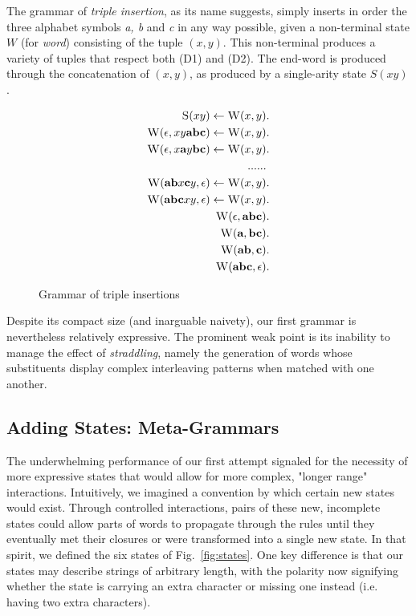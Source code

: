 \documentclass[nonatbib,numbers,10pt]{llncs}
\newcommand\s{\textsc}
\begin{document}
The grammar of \textit{triple insertion}, as its name suggests, simply inserts in order the three alphabet symbols \textit{a, b} and \textit{c} in any way possible, given a non-terminal state $W$ (for \textit{word}) consisting of the tuple $(x,y)$. This non-terminal produces a variety of tuples that respect both (D1) and (D2). The end-word is produced through the concatenation of $(x,y)$, as produced by a single-arity state $S(xy)$.
\begin{figure}[h!]
\begin{align}
\setcounter{equation}{0}
\s{S}(xy) \leftarrow \s{W}(x,y)&. \\
\s{W}(\epsilon, xy\textbf{abc}) \leftarrow \s{W}(x,y)&. \\
\s{W}(\epsilon, x\textbf{a}y\textbf{bc}) \leftarrow \s{W}(x,y)&. \\
...... \nonumber \\
\setcounter{equation}{59}
\s{W}(\textbf{ab}x\textbf{c}y, \epsilon) \leftarrow \s{W}(x,y)&. \\
\s{W}(\textbf{abc}xy, \epsilon) \leftarrow \s{W}(x,y)&. \\
\s{W}(\epsilon, \textbf{abc})&. \\
\s{W}(\textbf{a}, \textbf{bc})&. \\
\s{W}(\textbf{ab}, \textbf{c})&. \\
\s{W}(\textbf{abc}, \epsilon)&.
\end{align}
\caption{Grammar of triple insertions}
\end{figure}

Despite its compact size (and inarguable naivety), our first grammar is nevertheless relatively expressive. The prominent weak point is its inability to manage the effect of \textit{straddling}, namely the generation of words whose substituents display complex interleaving patterns when matched with one another.
\subsection{Adding States: Meta-Grammars}
The underwhelming performance of our first attempt signaled for the necessity of more expressive states that would allow for more complex, "longer range" interactions. Intuitively, we imagined a convention by which certain new states would exist. Through controlled interactions, pairs of these new, incomplete states could allow parts of words to propagate through the rules until they eventually met their closures or were transformed into a single new state. In that spirit, we defined the six states of Fig.~\ref{fig:states}. One key difference is that our states may describe strings of arbitrary length, with the polarity now signifying whether the state is carrying an extra character or missing one instead (i.e. having two extra characters).
\end{document}

